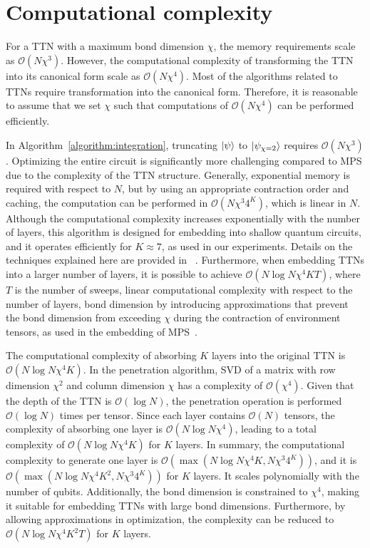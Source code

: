 \documentclass[12pt,dvipdfmx,twoside,openright]{report}
\begin{document}
\section{Computational complexity}
For a TTN with a maximum bond dimension $\chi$, the memory requirements scale as $\mathcal{O}(N\chi^3)$.
However, the computational complexity of transforming the TTN into its canonical form scale as $\mathcal{O}(N\chi^4)$.
Most of the algorithms related to TTNs require transformation into the canonical form.
Therefore, it is reasonable to assume that we set $\chi$ such that computations of $\mathcal{O}(N\chi^4)$ can be performed efficiently.

In Algorithm~\ref{algorithm:integration}, truncating $\ket{\psi}$ to $\ket{\psi_{\chi=2}}$ requires $\mathcal{O}(N\chi^3)$.
Optimizing the entire circuit is significantly more challenging compared to MPS due to the complexity of the TTN structure.
Generally, exponential memory is required with respect to $N$, but by using an appropriate contraction order and caching, the computation can be performed in $\mathcal{O}(N\chi^3 4^K)$, which is linear in $N$.
Although the computational complexity increases exponentially with the number of layers, this algorithm is designed for embedding into shallow quantum circuits, and it operates efficiently for $K \approx 7$, as used in our experiments.
Details on the techniques explained here are provided in ~\cite{inomata2025}.
Furthermore, when embedding TTNs into a larger number of layers, it is possible to achieve $\mathcal{O}(N\log{N}\chi^4KT)$, where $T$ is the number of sweeps, linear computational complexity with respect to the number of layers, bond dimension by introducing approximations that prevent the bond dimension from exceeding $\chi$ during the contraction of environment tensors, as used in the embedding of MPS~\cite{mpsdecomp}.

The computational complexity of absorbing $K$ layers into the original TTN is $\mathcal{O}(N\log{N}\chi^4K)$.
In the penetration algorithm, SVD of a matrix with row dimension $\chi^2$ and column dimension $\chi$ has a complexity of $\mathcal{O}(\chi^4)$.
Given that the depth of the TTN is $\mathcal{O}(\log{N})$, the penetration operation is performed $\mathcal{O}(\log{N})$ times per tensor.
Since each layer contains $\mathcal{O}(N)$ tensors, the complexity of absorbing one layer is $\mathcal{O}(N\log{N}\chi^4)$, leading to a total complexity of $\mathcal{O}(N\log{N}\chi^4K)$ for $K$ layers.
In summary, the computational complexity to generate one layer is $\mathcal{O}(\max (N\log{N}\chi^4 K, N\chi^3 4^K))$, and it is $\mathcal{O}(\max (N\log{N}\chi^4 K^2, N\chi^3 4^K))$ for $K$ layers.
It scales polynomially with the number of qubits.
Additionally, the bond dimension is constrained to $\chi^4$, making it suitable for embedding TTNs with large bond dimensions.
Furthermore, by allowing approximations in optimization, the complexity can be reduced to $\mathcal{O}(N\log{N}\chi^4 K^2T)$ for $K$ layers.
\end{document}
